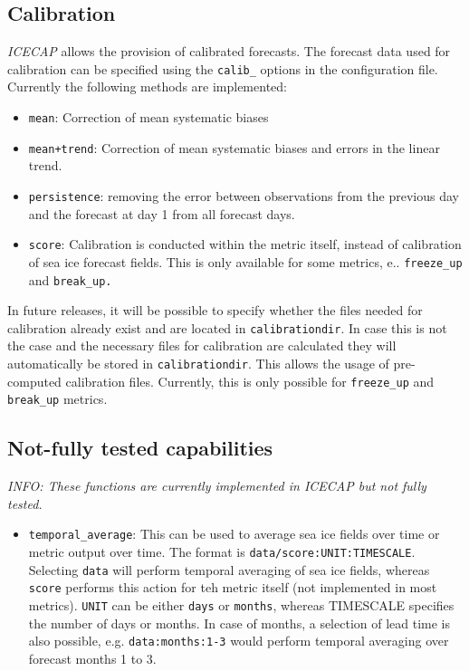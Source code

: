 \documentclass[DIV=10, parskip=full]{scrreprt}
\newcommand{\ice}{\textit{ICECAP}\xspace}
\newcommand{\notimplement}[1]{#1}
\newcommand{\info}[1]{\textit{INFO: #1}}
\begin{document}
\subsection{Calibration}
\ice allows the provision of calibrated forecasts. The forecast data used for calibration can be specified using the \texttt{calib\_} options in the configuration file. \\
Currently the following methods are implemented:
\begin{itemize}
	\item \texttt{mean}: Correction of mean systematic biases 
	\item \texttt{mean+trend}: Correction of mean systematic biases and errors in the linear trend.
	\item \texttt{persistence}: removing the error between observations from the previous day and the forecast at day 1 from all forecast days. 
	\item \texttt{score}: Calibration is conducted within the metric itself, instead of calibration of sea ice forecast fields. This is only available for some metrics, e.. \texttt{freeze\_up} and \texttt{break\_up.}
\end{itemize}

\notimplement{In future releases, it will be possible to specify whether the files needed for calibration already exist and are located in \texttt{calibrationdir}. In case this is not the case and the necessary files for calibration are calculated they will automatically be stored in \texttt{calibrationdir}. This allows the usage of pre-computed calibration files. Currently, this is only possible for \texttt{freeze\_up} and \texttt{break\_up} metrics. }

\subsection{Not-fully tested capabilities}
\info{These functions are currently implemented in \ice but not fully tested.}

\begin{itemize}
	\item \texttt{temporal\_average}: This can be used to average sea ice fields over time or metric output over time. The format is \texttt{data/score:UNIT:TIMESCALE}. Selecting \texttt{data} will perform temporal averaging of sea ice fields, whereas \texttt{score} performs this action for teh metric itself (not implemented in most metrics). \texttt{UNIT} can be either \texttt{days} or \texttt{months}, whereas {TIMESCALE} specifies the number of days or months. In case of months, a selection of lead time is also possible, e.g. \texttt{data:months:1-3} would perform temporal averaging over forecast months 1 to 3.
\end{itemize}
\end{document}
